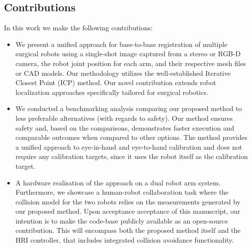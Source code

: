 \subsection{Contributions}

In this work we make the following contributions:
\begin{itemize}
    \item We present a unified approach for base-to-base registration of multiple surgical robots using a single-shot image captured from a stereo or RGB-D camera, the robot joint position for each arm, and their respective mesh files or CAD models. Our methodology utilizes the well-established Iterative Closest Point (ICP) method. Our novel contribution extends robot localization approaches specifically tailored for surgical robotics.
    \item We conducted a benchmarking analysis comparing our proposed method to less preferable alternatives (with regards to safety). Our method ensures safety and, based on the comparisons, demonstrates faster execution and comparable outcomes when compared to other options. The method provides a unified approach to eye-in-hand and eye-to-hand calibration and does not require any calibration targets, since it uses the robot itself as the calibration target.
    \item A hardware realisation of the approach on a dual robot arm system. Furthermore, we showcase a human-robot collaboration task where the collision model for the two robots relies on the measurements generated by our proposed method. Upon acceptance acceptance of this manuscript, our intention is to make the code-base publicly available as an open-source contribution. This will encompass both the proposed method itself and the HRI controller, that includes integrated collision avoidance functionality.
\end{itemize}




